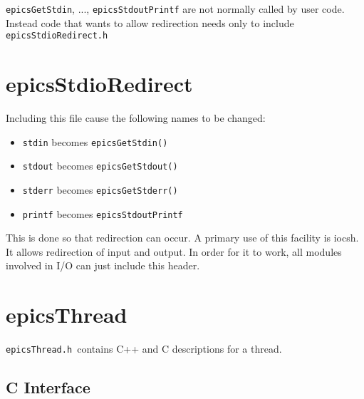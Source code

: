 \verb|epicsGetStdin|, ..., \verb|epicsStdoutPrintf| are not normally called by user code. Instead code that wants to 
allow redirection needs only to include \verb|epicsStdioRedirect.h|

\section{epicsStdioRedirect}

Including this file cause the following names to be changed:

\begin{itemize}
\item \verb|stdin| becomes \verb|epicsGetStdin()|

\item \verb|stdout| becomes \verb|epicsGetStdout()|

\item \verb|stderr| becomes \verb|epicsGetStderr()|

\item \verb|printf| becomes \verb|epicsStdoutPrintf|

\end{itemize}

This is done so that redirection can occur. A primary use of this facility is iocsh. It allows redirection of input and output. 
In order for it to work, all modules involved in I/O can just include this header.

\section{epicsThread}

\verb|epicsThread.h |contains C++ and C descriptions for a thread.

\subsection{C Interface}

